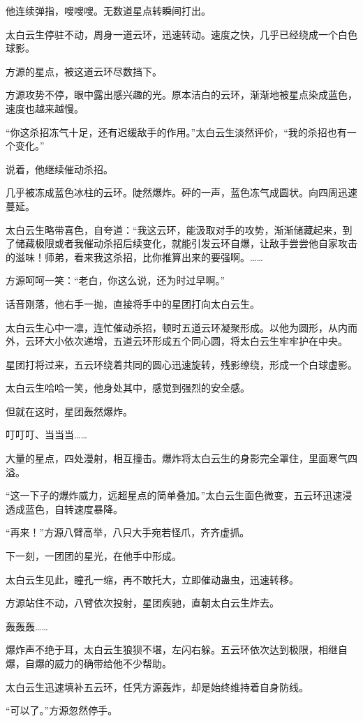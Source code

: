 \begin{this_body}
他连续弹指，嗖嗖嗖。无数道星点转瞬间打出。

太白云生停驻不动，周身一道云环，迅速转动。速度之快，几乎已经绕成一个白色球影。

方源的星点，被这道云环尽数挡下。

方源攻势不停，眼中露出感兴趣的光。原本洁白的云环，渐渐地被星点染成蓝色，速度也越来越慢。

“你这杀招冻气十足，还有迟缓敌手的作用。”太白云生淡然评价，“我的杀招也有一个变化。”

说着，他继续催动杀招。

几乎被冻成蓝色冰柱的云环。陡然爆炸。砰的一声，蓝色冻气成圆状。向四周迅速蔓延。

太白云生略带喜色，自夸道：“我这云环，能汲取对手的攻势，渐渐储藏起来，到了储藏极限或者我催动杀招后续变化，就能引发云环自爆，让敌手尝尝他自家攻击的滋味！师弟，看来我这杀招，比你推算出来的要强啊。……

方源呵呵一笑：“老白，你这么说，还为时过早啊。”

话音刚落，他右手一抛，直接将手中的星团打向太白云生。

太白云生心中一凛，连忙催动杀招，顿时五道云环凝聚形成。以他为圆形，从内而外，云环大小依次递增，五道云环形成五个同心圆，将太白云生牢牢护在中央。

星团打将过来，五云环绕着共同的圆心迅速旋转，残影缭绕，形成一个白球虚影。

太白云生哈哈一笑，他身处其中，感觉到强烈的安全感。

但就在这时，星团轰然爆炸。

叮叮叮、当当当……

大量的星点，四处漫射，相互撞击。爆炸将太白云生的身影完全罩住，里面寒气四溢。

“这一下子的爆炸威力，远超星点的简单叠加。”太白云生面色微变，五云环迅速浸透成蓝色，自转速度暴降。

“再来！”方源八臂高举，八只大手宛若怪爪，齐齐虚抓。

下一刻，一团团的星光，在他手中形成。

太白云生见此，瞳孔一缩，再不敢托大，立即催动蛊虫，迅速转移。

方源站住不动，八臂依次投射，星团疾驰，直朝太白云生炸去。

轰轰轰……

爆炸声不绝于耳，太白云生狼狈不堪，左闪右躲。五云环依次达到极限，相继自爆，自爆的威力的确带给他不少帮助。

太白云生迅速填补五云环，任凭方源轰炸，却是始终维持着自身防线。

“可以了。”方源忽然停手。


\end{this_body}

